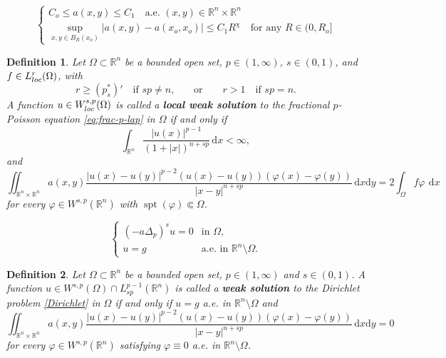 \documentclass[10pt,a4paper]{amsart}
\newtheorem{definition}{Definition}
\newcommand{\R}{\ensuremath{\mathbb{R}}}
\renewcommand{\d}{\:\! \mathrm{d}}
\DeclareMathOperator{\loc}{loc}
\newcommand{\spt}{\operatorname{spt}}
\begin{document}
\begin{equation}\label{eq:a-condition}
\left\{
    \begin{array}{cc}
       C_o\le a(x,y)\le C_1 \quad  \mbox{a.e. $(x,y)\in\R^n\times\R^n$} \\[5pt]
       \displaystyle\sup_{x,y\in B_R(x_o)}|a(x,y)-a(x_o,x_o)|\le C_1 R^{\chi}\quad \mbox{for any $R\in(0,R_o]$}%
    \end{array}
    \right.
\end{equation}

\begin{definition}\label{def:weak-sol}
Let $\Omega\subset\mathbb R^n$ be a bounded open set, $p\in(1,\infty)$, $s\in(0,1)$, and $f\in L^{r}_{\rm loc}(\Omega)$, with
$$
    r\ge (p_s^\ast)'\quad\mbox{if $sp\not=n$,}
    \qquad\mbox{or}\qquad 
    r>1 \quad\mbox{if $sp=n$.}
$$
A function $u\in W^{s,p}_{\rm loc}(\Omega)$
is called a  {\bf local weak solution} to the fractional $p$-Poisson equation \eqref{eq:frac-p-lap} in $\Omega$ if and only if
\begin{equation}\label{Lebesgue-weight}
\int_{\mathbb R^n}\frac{|u(x)|^{p-1}}{(1+|x|)^{n+sp}}\, \mathrm{d}x <\infty,
\end{equation}
and
\begin{equation*}
        \iint_{\mathbb R^n\times\mathbb R^n}a(x,y)\frac{|u(x)-u(y)|^{p-2}(u(x)-u(y))(\varphi(x)-\varphi(y))}{|x-y|^{n+sp}}\,\mathrm{d}x \mathrm{d}y =2\int_{\Omega} f \varphi \, \d x
\end{equation*}
for every $\varphi\in W^{s,p}(\R^n)$ with $\spt(\varphi)\Subset\Omega$.
\end{definition}

\begin{equation}\label{Dirichlet} 
\left\{
    \begin{array}{cl}
      (- a\Delta_p)^s u  = 0 & \mbox{in $\Omega$,} \\[6pt]
      u = g & \mbox{a.e.~in $\R^n \setminus \Omega$.}
    \end{array}
\right.
\end{equation}

\begin{definition}\label{def:weak-sol-D}
Let $\Omega\subset\mathbb R^n$ be a bounded open set, $p\in(1,\infty)$ and $s\in(0,1)$. A function $u\in W^{s,p}(\Omega)\cap L^{p-1}_{sp}(\R^n)$ is called a {\bf weak solution} to the Dirichlet problem \eqref{Dirichlet} in $\Omega$ if and only if $u=g$ a.e. in $\R^n\setminus\Omega$
and
\begin{equation*}
        \iint_{\mathbb R^n\times\mathbb R^n}a(x,y)\frac{|u(x)-u(y)|^{p-2}(u(x)-u(y))(\varphi(x)-\varphi(y))}{|x-y|^{n+sp}}\,\mathrm{d}x \mathrm{d}y =0
\end{equation*}
for every $\varphi\in W^{s,p}(\R^n)$ satisfying $\varphi\equiv0$ a.e. in $\R^n\setminus\Omega$.
\end{definition}
\end{document}

